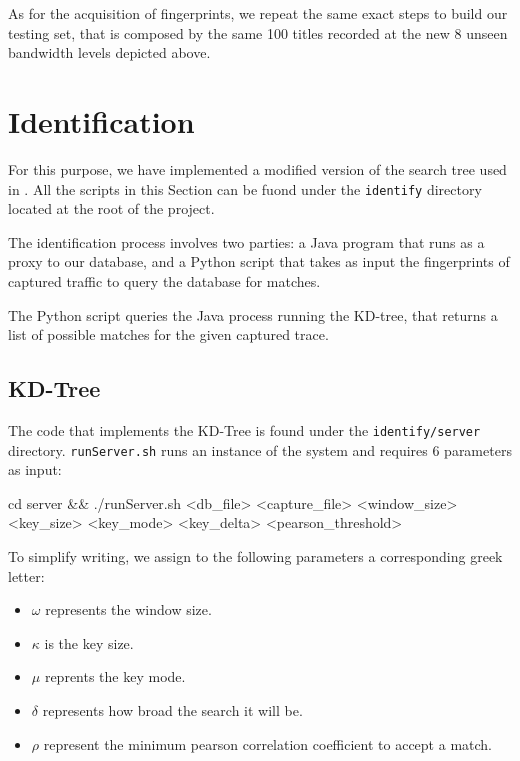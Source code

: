 As for the acquisition of fingerprints, we repeat the same exact steps to build
our testing set, that is composed by the same 100 titles recorded at the new 8
unseen bandwidth levels depicted above. 

\section{Identification}

For this purpose, we have implemented a modified version of the search tree
used in \cite{netflix-real-time}. All the scripts in this Section can be fuond
under the \texttt{identify} directory located at the root of the project.

The identification process involves two parties: a Java program that runs as
a proxy to our database, and a Python script that takes as input the
fingerprints of captured traffic to query the database for matches.

The Python script queries the Java process running the KD-tree, that returns a
list of possible matches for the given captured trace.

\subsection{KD-Tree}\label{sec:KD}

The code that implements the KD-Tree is found under the \texttt{identify/server}
directory. \texttt{runServer.sh} runs an instance of the system and requires 6
parameters as input:

\begin{bash_script}[caption={Start the Java Server}, label={lst:java}]
        cd server && ./runServer.sh <db_file> <capture_file> <window_size> <key_size> <key_mode> <key_delta> <pearson_threshold>
\end{bash_script}

To simplify writing, we assign to the following parameters a corresponding greek letter:

\begin{itemize}
    \item $\omega$ represents the window size.
    \item $\kappa$ is the key size. 
    \item $\mu$ reprents the key mode.
    \item $\delta$ represents how broad the search it will be.
    \item $\rho$ represent the minimum pearson correlation coefficient to accept a match.
\end{itemize}

